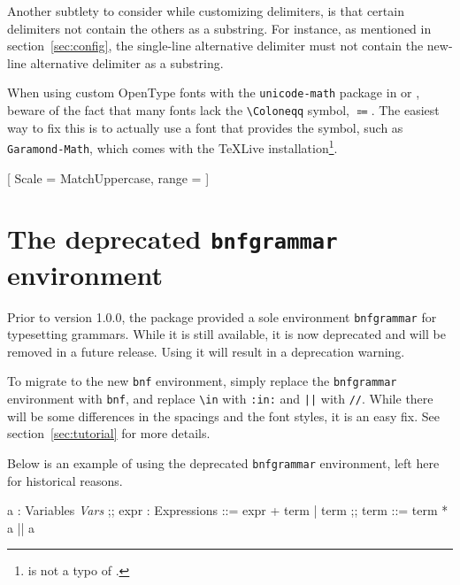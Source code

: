 \documentclass[11pt]{article}
\newcommand*{\XeLaTeX}{\hologo{XeLaTeX}}
\newcommand*{\LuaLaTeX}{\hologo{LuaLaTeX}}
\begin{document}
Another subtlety to consider while customizing delimiters, is that certain delimiters not contain the others as a substring.
For instance, as mentioned in section~\ref{sec:config}, the single-line alternative delimiter must not contain the new-line alternative delimiter as a substring.

When using custom OpenType fonts with the \verb/unicode-math/ package in \XeLaTeX{} or \LuaLaTeX{}, beware of the fact that many fonts lack the \verb/\Coloneqq/ symbol, $\Coloneqq$.
The easiest way to fix this is to actually use a font that provides the symbol, such as \verb/Garamond-Math/, which comes with the \TeX{}Live installation\footnote{\fakeverb{\Coloneq} is not a typo of \fakeverb{\Coloneqq}.}.
\begin{listing}
[
  Scale = MatchUppercase,
  range = {\Coloneq}
]
\end{listing}


\section{The deprecated \texttt{bnfgrammar} environment}
Prior to version 1.0.0, the package provided a sole environment \verb/bnfgrammar/ for typesetting grammars.
While it is still available, it is now deprecated and will be removed in a future release.
Using it will result in a deprecation warning.

To migrate to the new \verb/bnf/ environment, simply replace the \verb/bnfgrammar/ environment with \verb/bnf/, and replace \verb/\in/ with \verb/:in:/ and \verb/||/ with \verb|//|.
While there will be some differences in the spacings and the font styles, it is an easy fix.
See section~\ref{sec:tutorial} for more details.

Below is an example of using the deprecated \verb/bnfgrammar/ environment, left here for historical reasons.
\begin{example}
  \begin{bnfgrammar}
    a : Variables \in \textit{Vars}
    ;;
    expr : Expressions ::=
      expr + term
    | term
    ;;
    term ::= term * a || a
  \end{bnfgrammar}
\end{example}
\end{document}
